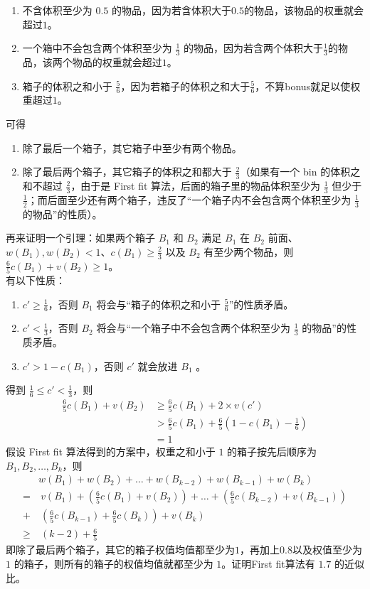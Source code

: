 \begin{enumerate}
    \item 不含体积至少为 $0.5$ 的物品，因为若含体积大于$0.5$的物品，该物品的权重就会超过$1$。
    \item 一个箱中不会包含两个体积至少为 $\frac{1}{3}$ 的物品，因为若含两个体积大于$\frac{1}{3}$的物品，该两个物品的权重就会超过$1$。
    \item 箱子的体积之和小于 $\frac{5}{6}$，因为若箱子的体积之和大于$\frac{5}{6}$，不算bonus就足以使权重超过$1$。
\end{enumerate}
可得
\begin{enumerate}
    \item 除了最后一个箱子，其它箱子中至少有两个物品。
    \item 除了最后两个箱子，其它箱子的体积之和都大于 $\frac{2}{3}$（如果有一个 bin 的体积之和不超过 $\frac{2}{3}$，由于是 First fit 算法，后面的箱子里的物品体积至少为 $\frac{1}{3}$ 但少于 $\frac{1}{2}$；而后面至少还有两个箱子，违反了“一个箱子内不会包含两个体积至少为 $\frac{1}{3}$ 的物品”的性质）。
\end{enumerate}
再来证明一个引理：如果两个箱子 $B_1$ 和 $B_2$ 满足 $B_1$ 在 $B_2$ 前面、$w(B_1), w(B_2) < 1$、$c(B_1) \ge \frac{2}{3}$ 以及 $B_2$ 有至少两个物品，则 $\frac{6}{5}c(B_1) + v(B_2) \ge 1$。 \\
有以下性质：
\begin{enumerate}
    \item $c' \ge \frac{1}{6}$，否则 $B_1$ 将会与“箱子的体积之和小于 $\frac{5}{6}$”的性质矛盾。
    \item $ c' < \frac{1}{3}$，否则 $B_2$ 将会与“一个箱子中不会包含两个体积至少为 $\frac{1}{3}$ 的物品”的性质矛盾。
    \item $c' > 1 - c(B_1)$，否则 $c'$ 就会放进 $B_1$ 。
\end{enumerate}
得到 $\frac{1}{6} \le c' < \frac{1}{3}$，则
\begin{align}
    \frac{6}{5}c(B_1) + v(B_2) & \ge \frac{6}{5}c(B_1) + 2 \times v(c') \nonumber \\ 
    & > \frac{6}{5}c(B_1) + \frac{6}{5}(1 - c(B_1) - \frac{1}{6}) \nonumber \\ 
    & = 1 \nonumber
\end{align}
假设 First fit 算法得到的方案中，权重之和小于 $1$ 的箱子按先后顺序为 $B_1, B_2, \dots, B_k$，则
\begin{equation}
\begin{split}
    & w(B_1) + w(B_2) + \dots + w(B_{k-2}) + w(B_{k-1}) + w(B_k) \nonumber \\ 
    = & \ v(B_1) + (\frac{6}{5}c(B_1) + v(B_2)) + \dots + (\frac{6}{5}c(B_{k-2}) + v(B_{k-1})) \nonumber \\
    + & \ (\frac{6}{5}c(B_{k-1}) + \frac{6}{5}c(B_k)) + v(B_k) \nonumber \\ 
    \ge & \ (k-2) + \frac{6}{5} \nonumber
\end{split}
\end{equation}
即除了最后两个箱子，其它的箱子权值均值都至少为$1$，再加上$0.8$以及权值至少为 $1$ 的箱子，则所有的箱子的权值均值就都至少为 $1$。证明First fit算法有 $1.7$ 的近似比。

